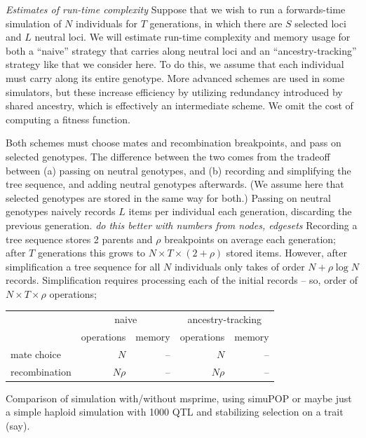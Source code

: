\documentclass{article}
\newcommand{\plr}[1]{{\em \color{blue} #1}}
\begin{document}
\plr{Estimates of run-time complexity}
Suppose that we wish to run a forwards-time simulation of $N$ individuals for $T$ generations,
in which there are $S$ selected loci and $L$ neutral loci.
We will estimate run-time complexity and memory usage for both a ``naive'' strategy that carries along neutral loci
and an ``ancestry-tracking'' strategy like that we consider here.
To do this, we assume that each individual must carry along its entire genotype.
More advanced schemes are used in some simulators,
but these increase efficiency by utilizing redundancy introduced by shared ancestry, 
which is effectively an intermediate scheme.
We omit the cost of computing a fitness function.

Both schemes must choose mates and recombination breakpoints,
and pass on selected genotypes.
The difference between the two comes from the tradeoff between
(a) passing on neutral genotypes, and
(b) recording and simplifying the tree sequence, and adding neutral genotypes afterwards.
(We assume here that selected genotypes are stored in the same way for both.)
Passing on neutral genotypes naively records $L$ items per individual each generation, discarding the previous generation.
\plr{do this better with numbers from nodes, edgesets}
Recording a tree sequence stores 2 parents and $\rho$ breakpoints on average each generation;
after $T$ generations this grows to $N \times T \times (2 + \rho)$ stored items.
However, after simplification a tree sequence for all $N$ individuals
only takes of order $N + \rho \log N$ records.
Simplification requires processing each of the initial records -- so, order of $N \times T \times \rho$ operations;


\begin{table}
\begin{center}
    \begin{tabular}{l||r|r||r|r|}
                    & \multicolumn{2}{|c|}{naive} & \multicolumn{2}{|c|}{ancestry-tracking} \\
                    & operations  & memory & operations  & memory \\
        mate choice & $N$       &   --  &   $N$     & -- \\
        recombination & $N\rho$ &   --  &   $N\rho$ & -- \\
    \end{tabular}
\end{center}
\end{table}

Comparison of simulation with/without msprime, using simuPOP 
or maybe just a simple haploid simulation with 1000 QTL and stabilizing selection on a trait (say).
\end{document}
